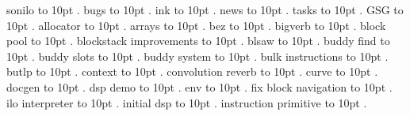 
\pdfpagewidth=148mm
\pdfpageheight=210mm
\hsize=128mm
\vsize=190mm

\pdfhorigin=0pt
\pdfvorigin=0pt
\hoffset=10mm
\voffset=10mm
\noindent sonilo \leaders\hbox to 10pt {\hss.\hss}  \hfill {}
\smallskip
\noindent bugs \leaders\hbox to 10pt {\hss.\hss}  \hfill {}
\smallskip
\noindent ink \leaders\hbox to 10pt {\hss.\hss}  \hfill {}
\smallskip
\noindent news \leaders\hbox to 10pt {\hss.\hss}  \hfill {}
\smallskip
\noindent tasks \leaders\hbox to 10pt {\hss.\hss}  \hfill {}
\smallskip
\noindent GSG \leaders\hbox to 10pt {\hss.\hss}  \hfill {}
\smallskip
\noindent allocator \leaders\hbox to 10pt {\hss.\hss}  \hfill {}
\smallskip
\noindent arrays \leaders\hbox to 10pt {\hss.\hss}  \hfill {}
\smallskip
\noindent bez \leaders\hbox to 10pt {\hss.\hss}  \hfill {}
\smallskip
\noindent bigverb \leaders\hbox to 10pt {\hss.\hss}  \hfill {}
\smallskip
\noindent block pool \leaders\hbox to 10pt {\hss.\hss}  \hfill {}
\smallskip
\noindent blockstack improvements \leaders\hbox to 10pt {\hss.\hss}  \hfill {}
\smallskip
\noindent blsaw \leaders\hbox to 10pt {\hss.\hss}  \hfill {}
\smallskip
\noindent buddy find \leaders\hbox to 10pt {\hss.\hss}  \hfill {}
\smallskip
\noindent buddy slots \leaders\hbox to 10pt {\hss.\hss}  \hfill {}
\smallskip
\noindent buddy system \leaders\hbox to 10pt {\hss.\hss}  \hfill {}
\smallskip
\noindent bulk instructions \leaders\hbox to 10pt {\hss.\hss}  \hfill {}
\smallskip
\noindent butlp \leaders\hbox to 10pt {\hss.\hss}  \hfill {}
\smallskip
\noindent context \leaders\hbox to 10pt {\hss.\hss}  \hfill {}
\smallskip
\noindent convolution reverb \leaders\hbox to 10pt {\hss.\hss}  \hfill {}
\smallskip
\noindent curve \leaders\hbox to 10pt {\hss.\hss}  \hfill {}
\smallskip
\noindent docgen \leaders\hbox to 10pt {\hss.\hss}  \hfill {}
\smallskip
\noindent dsp demo \leaders\hbox to 10pt {\hss.\hss}  \hfill {}
\smallskip
\noindent env \leaders\hbox to 10pt {\hss.\hss}  \hfill {}
\smallskip
\noindent fix block navigation \leaders\hbox to 10pt {\hss.\hss}  \hfill {}
\smallskip
\noindent ilo interpreter \leaders\hbox to 10pt {\hss.\hss}  \hfill {}
\smallskip
\noindent initial dsp \leaders\hbox to 10pt {\hss.\hss}  \hfill {}
\smallskip
\noindent instruction primitive \leaders\hbox to 10pt {\hss.\hss}  \hfill {}
